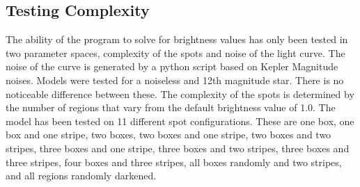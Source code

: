 

\subsection{Testing Complexity \label{complexity}}
The ability of the program to solve for brightness values has only been tested in two parameter spaces, complexity of the spots and noise of the light curve. The noise of the curve is generated by a python script based on Kepler Magnitude noises. Models were tested for a noiseless and 12th magnitude star. There is no noticeable difference between these.
The complexity of the spots is determined by the number of regions that vary from the default brightness value of 1.0. The model has been tested on 11 different spot configurations. These are one box, one box and one stripe, two boxes, two boxes and one stripe, two boxes and two stripes, three boxes and one stripe, three boxes and two stripes, three boxes and three stripes, four boxes and three stripes, all boxes randomly and two stripes, and all regions randomly darkened.